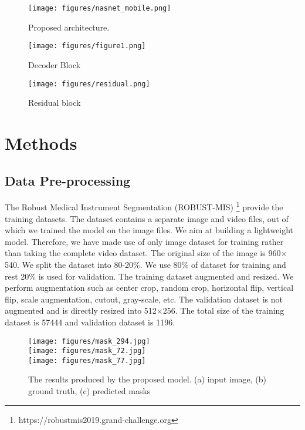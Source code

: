 \documentclass[conference]{IEEEtran}
\begin{document}
\begin{figure} []
    \centering
    \texttt{[image: figures/nasnet\_mobile.png]}
    \caption{Proposed architecture.}
    \label{fig:learning_curve}
\end{figure}
\begin{figure} 
    \centering
    \texttt{[image: figures/figure1.png]}
    \caption{Decoder Block} 
    \label{fig:learning_curve}
\end{figure}
\begin{figure} []
    \centering
    \texttt{[image: figures/residual.png]}
    \caption{Residual block}
    \label{fig:learning_curve}
\end{figure}



\section{Methods}
\subsection{Data Pre-processing}
The Robust Medical Instrument Segmentation (ROBUST-MIS) \footnote{https://robustmis2019.grand-challenge.org} provide the training datasets. The dataset contains a separate image and video files, out of which we trained the model on the image files. We aim at building a lightweight model. Therefore, we have made use of only image dataset for training rather than taking the complete video dataset. The original size of the image is 960$\times$540. We split the dataset into 80-20\%. We use 80\% of dataset for training and rest 20\% is used for validation. The training dataset augmented and resized. We perform augmentation such as center crop, random crop, horizontal flip, vertical flip, scale augmentation, cutout, gray-scale, etc. The validation dataset is not augmented and is directly resized into 512$\times$256. The total size of the training dataset is 57444 and validation dataset is 1196. 


\begin{figure}
    \centering
    \texttt{[image: figures/mask\_294.jpg]}\\
    \vspace{1mm}
    \texttt{[image: figures/mask\_72.jpg]}\\
     \vspace{1mm}
    \texttt{[image: figures/mask\_77.jpg]}
    \caption{The results produced by the proposed model. (a) input image, (b) ground truth, (c) predicted masks}
    \label{fig:results}
\end{figure}
\end{document}
